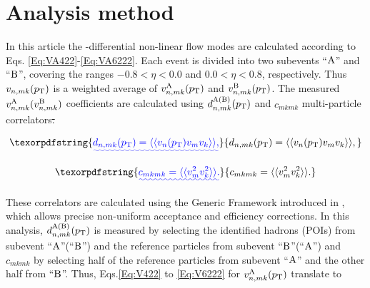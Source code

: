\documentclass[ALICE,manyauthors]{cernphprep}
\providecommand{\DIFaddtex}[1]{{\protect\color{blue}\uwave{#1}}} %
\providecommand{\DIFdeltex}[1]{{\protect\color{red}\sout{#1}}}                      %
\providecommand{\DIFaddbegin}{} %
\providecommand{\DIFaddend}{} %
\providecommand{\DIFdelbegin}{} %
\providecommand{\DIFdelend}{} %
\providecommand{\DIFadd}[1]{\texorpdfstring{\DIFaddtex{#1}}{#1}} %
\providecommand{\DIFdel}[1]{\texorpdfstring{\DIFdeltex{#1}}{}} %
\begin{document}


\section{Analysis method}
\label{Sec:Analysis method}
In this article the \pT-differential non-linear flow modes are calculated according to Eqs. \ref{Eq:VA422}-\ref{Eq:VA6222}. Each event is divided into two subevents ``$\rm{A}$'' and ``$\rm{B}$'', covering the ranges $-0.8< \eta < 0.0$ and $0.0 <\eta< 0.8$, respectively. Thus $v_{n,mk}(p_{\rm{T}})$ is a weighted average of $v_{n,mk}^{\rm{A}}(p_{\rm{T}})$ and $v_{n,mk}^{\rm{B}}(p_{\rm{T}})$. The measured \DIFdelbegin \DIFdel{$v_{n,mk}^{\rm{A}} (v_{n,mk}^{\rm{B}})$ }\DIFdelend \DIFaddbegin \DIFadd{$v_{n,mk}^{\rm{A(B)}}(p_{\rm{T}})$ }\DIFaddend coefficients are calculated using \DIFdelbegin \DIFdel{$d^{\rm{A(B)}}_{n,mk}(p_{\rm{T}})$ }\DIFdelend \DIFaddbegin \DIFadd{$d_{n,mk}(p_{\rm{T}})$ }\DIFaddend and $c_{mkmk}$ multi-particle correlators\DIFdelbegin \DIFdel{. }\DIFdelend \DIFaddbegin \DIFadd{;
}

\begin{equation}
\DIFadd{d_{n,mk}(p_{\rm{T}}) = \langle \langle v_{n}(p_{\rm{T}})v_{m}v_{k}\rangle \rangle,
\label{Eq:dnmki}
}\end{equation}


\begin{equation}
\DIFadd{c_{mkmk} = \langle \langle v_{m}^{2}v_{k}^{2}\rangle \rangle.
\label{Eq:cmkimki}
}\end{equation}

 
\DIFaddend These correlators are calculated using the Generic Framework introduced in \cite{Bilandzic:2013kga}, which allows precise non-uniform acceptance and efficiency corrections. In this analysis, \DIFdelbegin \DIFdel{$d^{\rm{A(B)}}_{n,mk}(p_{\rm{T}})$ }\DIFdelend \DIFaddbegin \DIFadd{$d_{n,mk}(p_{\rm{T}})$ }\DIFaddend is measured by selecting the identified hadrons (POIs) from subevent ``$\rm{A}$''(``$\rm{B}$'') and the reference particles from subevent ``$\rm{B}$''(``$\rm{A}$'') and $c_{mkmk}$ by selecting half of the reference particles from subevent ``$\rm{A}$'' and the other half from ``$\rm{B}$''. Thus, Eqs.\ref{Eq:V422} to \ref{Eq:V6222} for $v_{n,mk}^{\rm{A}}(p_{\rm{T}})$ translate to
\end{document}
